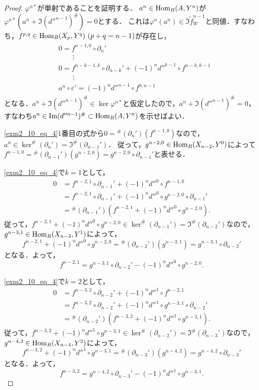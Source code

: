 \begin{proof}
  $\varphi^{n\ast}$が単射であることを証明する．
  $a^n \in \operatorname{Hom}_R(A, Y^n)$が$\varphi^{n\ast}(a^n + \Im (d''^{n-1})^\#) = 0$とする．
  これは$\varphi^n(a^n) \in \Im \tilde{f}_W^{n-1}$と同値．すなわち，$f^{p, q} \in \operatorname{Hom}_R(X_p, Y^q)~(p+q=n-1)$が存在し，
  \begin{align}
    \begin{split}
      & 0 = f^{n-1, 0} \circ \partial_n' \\
      & \qquad \vdots \\
      & 0 = f^{n-k-1, k} \circ \partial_{n-k}' + (-1)^n d''^{k-1} \circ f^{n-k, k-1} \\
      & \qquad \vdots \\
      & a^n \circ \varepsilon' = (-1)^n d''^{n-1} \circ f^{0, n-1}
    \end{split}
    \label{exm2_10_eq_4}
  \end{align}
  となる．$a^n + \Im (d''^{n-1})^\# \in \ker \varphi^{n\ast}$と仮定したので，$a^n + \Im (d''^{n-1})^\# = 0$，すなわち$a^n \in \operatorname{Im} (d''^{n-1})^\# \subset \operatorname{Hom}_R(A, Y^n)$を示せばよい．

  \eqref{exm2_10_eq_4}1番目の式から$0 = {}^\# (\partial_n')(f^{n-1, 0})$なので，$a^n \in \ker ^\# (\partial_n') = \Im ^\# (\partial_{n-1}')$．
  従って，$g^{n-2, 0} \in \operatorname{Hom}_R(X_{n-2}, Y^0)$によって$f^{n-1, 0} = {}^\# (\partial_{n-1}')(g^{n-2, 0}) = g^{n-2, 0} \circ \partial_{n-1}'$と表せる．

  \eqref{exm2_10_eq_4}で$k=1$として，
  \begin{align*}
    0 & = f^{n-2, 1} \circ \partial_{n-1}' + (-1)^n d''^{0} \circ f^{n-1, 0} \\
    & = f^{n-2, 1} \circ \partial_{n-1}' + (-1)^n d''^{0} \circ g^{n-2, 0} \circ \partial_{n-1}' \\
    & = {}^\#(\partial_{n-1}') \left( f^{n-2, 1} + (-1)^n d''^{0} \circ g^{n-2, 0} \right).
  \end{align*}
  従って，$f^{n-2, 1} + (-1)^n d''^{0} \circ g^{n-2, 0} \in \ker ^\#(\partial_{n-1}') = \Im ^\#(\partial_{n-2}')$なので，$g^{n-3, 1} \in \operatorname{Hom}_R(X_{n-3}, Y^1)$によって，
  \[ f^{n-2, 1} + (-1)^n d''^{0} \circ g^{n-2, 0} = {}^\#(\partial_{n-2}')(g^{n-3, 1}) = g^{n-3, 1} \circ \partial_{n-2}' \]
  となる．よって，
  \[ f^{n-2, 1} = g^{n-3, 1} \circ \partial_{n-2}' - (-1)^n d''^{0} \circ g^{n-2, 0}. \]

  \eqref{exm2_10_eq_4}で$k=2$として，
  \begin{align*}
    0 & = f^{n-3, 2} \circ \partial_{n-2}' + (-1)^n d''^{1} \circ f^{n-2, 1} \\
    & = f^{n-3, 2} \circ \partial_{n-2}' + (-1)^n d''^{1} \circ g^{n-3, 1} \circ \partial_{n-2}' \\
    & = {}^\#(\partial_{n-2}') \left( f^{n-3, 2} + (-1)^n d''^{1} \circ g^{n-3, 1} \right).
  \end{align*}
  従って，$f^{n-3, 2} + (-1)^n d''^{1} \circ g^{n-3, 1} \in \ker ^\#(\partial_{n-2}') = \Im ^\#(\partial_{n-3}')$なので，$g^{n-4, 2} \in \operatorname{Hom}_R(X_{n-4}, Y^2)$によって，
  \[ f^{n-3, 2} + (-1)^n d''^{1} \circ g^{n-3, 1} = {}^\#(\partial_{n-3}')(g^{n-4, 2}) = g^{n-4, 2} \circ \partial_{n-3}' \]
  となる．よって，
  \[ f^{n-3, 2} = g^{n-4, 2} \circ \partial_{n-3}' - (-1)^n d''^{1} \circ g^{n-3, 1}. \]


\end{proof}
